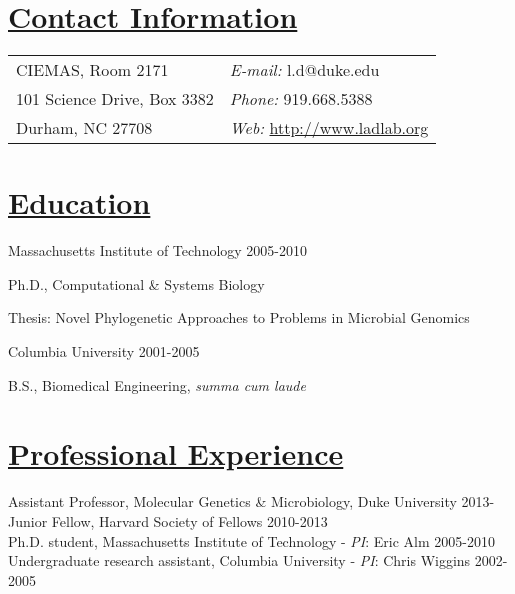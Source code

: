\documentclass[overlapped,line,11pt]{res}
\newenvironment{list1}{
  \begin{list}{\ding{113}}{%
      \setlength{\itemsep}{0in}
      \setlength{\parsep}{0in} \setlength{\parskip}{0in}
      \setlength{\topsep}{0in} \setlength{\partopsep}{0in} 
      \setlength{\leftmargin}{0.17in}}}{\end{list}}
\begin{document}
\setlength{\pdfpageheight}{\paperheight}
\setlength{\pdfpagewidth}{\paperwidth}


\begin{resume}
\section{\underline{\sc Contact Information}}
\vspace{.05in}
\begin{tabular}{@{}p{4in}p{4in}}

CIEMAS, Room 2171     & {\it E-mail:}    l.d@duke.edu \\                
101 Science Drive, Box 3382   & {\it Phone:} 919.668.5388 \\
Durham, NC 27708 & {\it Web:} \url{http://www.ladlab.org} 

\end{tabular}

\section{\underline{\sc Education}}
\vspace{.05in}
Massachusetts Institute of Technology
\hfill 2005-2010\\

\vspace*{-5mm}
\begin{list1}
\item[] Ph.D., Computational \& Systems Biology
\item[] Thesis: Novel Phylogenetic Approaches to Problems in Microbial Genomics
\end{list1}

\vspace*{-2.5mm}
Columbia University \hfill 2001-2005\\
\vspace*{-5mm}
\begin{list1}
\item[] B.S., Biomedical Engineering, \emph{summa cum laude}
\end{list1}

\section{\underline{\sc Professional Experience}}
\vspace{.05in}
Assistant Professor, Molecular Genetics \& Microbiology, Duke University \hfill 2013-\hspace{7.5mm} \\
Junior Fellow, Harvard Society of Fellows \hfill 2010-2013\\
Ph.D. student, Massachusetts Institute of Technology - \emph{PI}: Eric Alm \hfill
2005-2010 \\
Undergraduate research assistant, Columbia University - \emph{PI}: Chris Wiggins
\hfill 2002-2005 


\end{resume}
\end{document}
